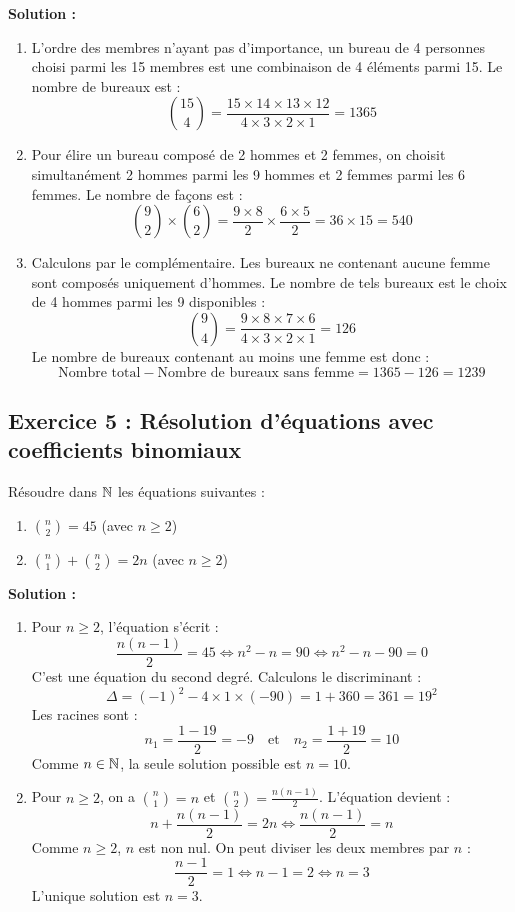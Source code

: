 \textbf{Solution :}
\begin{enumerate}
    \item L'ordre des membres n'ayant pas d'importance, un bureau de 4 personnes choisi parmi les 15 membres est une combinaison de 4 éléments parmi 15. Le nombre de bureaux est :
    \[
    \binom{15}{4} = \frac{15 \times 14 \times 13 \times 12}{4 \times 3 \times 2 \times 1} = 1365
    \]
    
    \item Pour élire un bureau composé de 2 hommes et 2 femmes, on choisit simultanément 2 hommes parmi les 9 hommes et 2 femmes parmi les 6 femmes. Le nombre de façons est :
    \[
    \binom{9}{2} \times \binom{6}{2} = \frac{9 \times 8}{2} \times \frac{6 \times 5}{2} = 36 \times 15 = 540
    \]
    
    \item Calculons par le complémentaire. Les bureaux ne contenant aucune femme sont composés uniquement d'hommes. Le nombre de tels bureaux est le choix de 4 hommes parmi les 9 disponibles :
    \[
    \binom{9}{4} = \frac{9 \times 8 \times 7 \times 6}{4 \times 3 \times 2 \times 1} = 126
    \]
    Le nombre de bureaux contenant au moins une femme est donc :
    \[
    \text{Nombre total} - \text{Nombre de bureaux sans femme} = 1365 - 126 = 1239
    \]
\end{enumerate}

\subsection*{Exercice 5 : Résolution d'équations avec coefficients binomiaux}
Résoudre dans $\mathbb{N}$ les équations suivantes :
\begin{enumerate}
    \item $\binom{n}{2} = 45$ (avec $n \ge 2$)
    \item $\binom{n}{1} + \binom{n}{2} = 2n$ (avec $n \ge 2$)
\end{enumerate}

\textbf{Solution :}
\begin{enumerate}
    \item Pour $n \ge 2$, l'équation s'écrit :
    \[
    \frac{n(n-1)}{2} = 45 \iff n^2 - n = 90 \iff n^2 - n - 90 = 0
    \]
    C'est une équation du second degré. Calculons le discriminant :
    \[
    \Delta = (-1)^2 - 4 \times 1 \times (-90) = 1 + 360 = 361 = 19^2
    \]
    Les racines sont :
    \[
    n_1 = \frac{1 - 19}{2} = -9 \quad \text{et} \quad n_2 = \frac{1 + 19}{2} = 10
    \]
    Comme $n \in \mathbb{N}$, la seule solution possible est $n=10$.
    
    \item Pour $n \ge 2$, on a $\binom{n}{1} = n$ et $\binom{n}{2} = \frac{n(n-1)}{2}$. L'équation devient :
    \[
    n + \frac{n(n-1)}{2} = 2n \iff \frac{n(n-1)}{2} = n
    \]
    Comme $n \ge 2$, $n$ est non nul. On peut diviser les deux membres par $n$ :
    \[
    \frac{n-1}{2} = 1 \iff n-1 = 2 \iff n = 3
    \]
    L'unique solution est $n=3$.
\end{enumerate}


